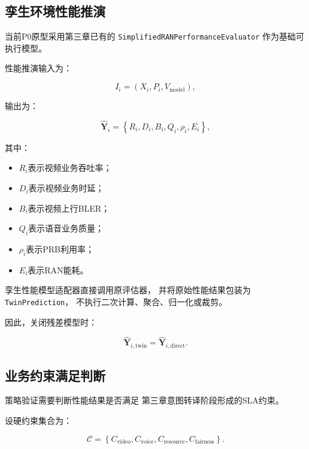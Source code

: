 \documentclass[lang=cn,12pt]{elegantbook}
\begin{document}
\subsection*{孪生环境性能推演}

当前P0原型采用第三章已有的
\texttt{SimplifiedRANPerformanceEvaluator}
作为基础可执行模型。

性能推演输入为：

\begin{equation}
I_i
=
\left(
X_i,
P_i,
V_{\mathrm{model}}
\right),
\end{equation}

输出为：

\begin{equation}
\hat{\boldsymbol{Y}}_i
=
\left\{
R_i,
D_i,
B_i,
Q_i,
\rho_i,
E_i
\right\},
\label{eq:twin_validation_metrics}
\end{equation}

其中：

\begin{itemize}
    \item $R_i$表示视频业务吞吐率；
    \item $D_i$表示视频业务时延；
    \item $B_i$表示视频上行BLER；
    \item $Q_i$表示语音业务质量；
    \item $\rho_i$表示PRB利用率；
    \item $E_i$表示RAN能耗。
\end{itemize}

孪生性能模型适配器直接调用原评估器，
并将原始性能结果包装为
\texttt{TwinPrediction}，
不执行二次计算、聚合、归一化或裁剪。

因此，关闭残差模型时：

\begin{equation}
\hat{\boldsymbol{Y}}_{i,\mathrm{twin}}
=
\hat{\boldsymbol{Y}}_{i,\mathrm{direct}}.
\label{eq:twin_direct_prediction_equal}
\end{equation}


\subsection*{业务约束满足判断}

策略验证需要判断性能结果是否满足
第三章意图转译阶段形成的SLA约束。

设硬约束集合为：

\begin{equation}
\mathcal{C}
=
\left\{
C_{\mathrm{video}},
C_{\mathrm{voice}},
C_{\mathrm{resource}},
C_{\mathrm{fairness}}
\right\}.
\label{eq:twin_hard_constraint_set}
\end{equation}
\end{document}
